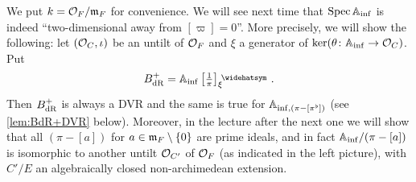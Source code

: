 We put $k=\mathcal{O}_F/\mathfrak{m}_F$ for convenience. We will see next time that $\operatorname{Spec}\mathbb{A}_{\mathrm{inf}}$ is indeed \enquote{two-dimensional away from $[\varpi]=0$}. More precisely, we will show the following: let $(\mathcal{O}_C,\iota)$ be an untilt of $\mathcal{O}_F$ and $\xi$ a generator of $\ker(\theta\colon \IA_\inf\morphism \Oo_C)$. Put
\begin{equation*}
	B_\dR^+=\IA_\inf\left[\textstyle \frac 1\pi\right]_\xi^\complete\,.
\end{equation*}
Then $B_{\mathrm{dR}}^+$ is always a DVR and the same is true for $\mathbb{A}_{\mathrm{inf},(\pi-[\pi^\flat])}$ (see \cref{lem:BdR+DVR} below). Moreover, in the lecture after the next one we will show that all $(\pi-[a])$ for $a\in\mathfrak{m}_F\setminus\{0\}$ are prime ideals, and in fact $\mathbb{A}_{\mathrm{inf}}/(\pi-[a])$ is isomorphic to another untilt $\mathcal{O}_{C'}$ of $\mathcal{O}_F$ (as indicated in the left picture), with $C'/E$ an algebraically closed non-archimedean extension.

